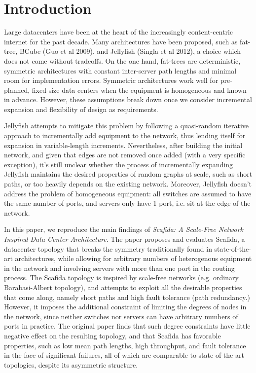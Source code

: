 \section{Introduction}

Large datacenters have been at the heart of the increasingly content-centric internet for the past decade. Many architectures have been proposed, such as fat-tree, BCube (Guo et al 2009), and Jellyfish (Singla et al 2012), a choice which does not come without tradeoffs. On the one hand, fat-trees are deterministic, symmetric architectures with constant inter-server path lengths and minimal room for implementation errors. Symmetric architectures work well for pre-planned, fixed-size data centers when the equipment is homogeneous and known in advance. However, these assumptions break down once we consider incremental expansion and flexibility of design as requirements.

Jellyfish attempts to mitigate this problem by following a quasi-random iterative approach to incrementally add equipment to the network, thus lending itself for expansion in variable-length increments. Nevertheless, after building the initial network, and given that edges are not removed once added (with a very specific exception), it’s still unclear whether the process of incrementally expanding Jellyfish maintains the desired properties of random graphs at scale, such as short paths, or too heavily depends on the existing network. Moreover, Jellyfish doesn’t address the problem of homogeneous equipment: all switches are assumed to have the same number of ports, and servers only have 1 port, i.e. sit at the edge of the network.

In this paper, we reproduce the main findings of \textit{Scafida: A Scale-Free Network Inspired Data Center Architecture}. The paper proposes and evaluates Scafida, a datacenter topology that breaks the symmetry traditionally found in state-of-the-art architectures, while allowing for arbitrary numbers of heterogenous equipment in the network and involving servers with more than one port in the routing process. The Scafida topology is inspired by scale-free networks (e.g. ordinary Barabasi-Albert topology), and attempts to exploit all the desirable properties that come along, namely short paths and high fault tolerance (path redundancy.) However, it imposes the additional constraint of limiting the degrees of nodes in the network, since neither switches nor servers can have arbitrary numbers of ports in practice. The original paper finds that such degree constraints have little negative effect on the resulting topology, and that Scafida has favorable properties, such as low mean path lengths, high throughput, and fault tolerance in the face of significant failures, all of which are comparable to state-of-the-art topologies, despite its asymmetric structure.

